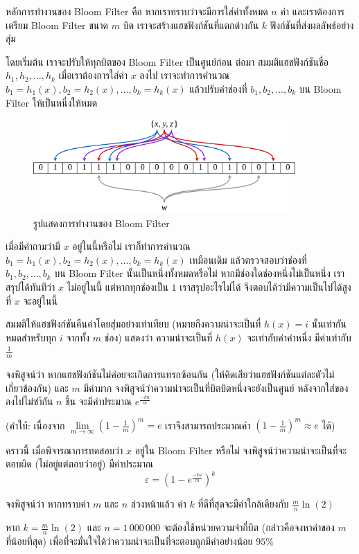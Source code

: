 หลักการทำงานของ Bloom Filter คือ หากเราทราบว่าจะมีการใส่ค่าทั้งหมด $n$ ค่า และเราต้องการเตรียม Bloom Filter ขนาด $m$ บิต เราจะสร้างแฮชฟังก์ชันที่แตกต่างกัน $k$ ฟังก์ชันที่ส่งผลลัพธ์อย่างสุ่ม

โดยเริ่มต้น เราจะปรับให้ทุกบิตของ Bloom Filter เป็นศูนย์ก่อน ต่อมา สมมติแฮชฟังก์ชันชื่อ $h_1, h_2, \dots, h_k$ เมื่อเราต้องการใส่ค่า $x$ ลงไป เราจะทำการคำนวณ $b_1 = h_1(x), b_2 = h_2(x), \dots, b_k = h_k(x)$ แล้วปรับค่าช่องที่ $b_1, b_2, \dots, b_k$ บน Bloom Filter ให้เป็นหนึ่งให้หมด

\begin{figure}[htbp]
    \centering
    \includegraphics[width=10cm]{chapters/bloomfilter.png}
    \caption{รูปแสดงการทำงานของ Bloom Filter}
    \label{fig:bloom_filter}
\end{figure}

เมื่อมีคำถามว่ามี $x$ อยู่ในนี้หรือไม่ เราก็ทำการคำนวณ $b_1 = h_1(x), b_2 = h_2(x), \dots, b_k = h_k(x)$ เหมือนเดิม แล้วตรวจสอบว่าช่องที่ $b_1, b_2, \dots, b_k$ บน Bloom Filter นั้นเป็นหนึ่งทั้งหมดหรือไม่ หากมีช่องใดช่องหนึ่งไม่เป็นหนึ่ง เราสรุปได้ทันทีว่า $x$ ไม่อยู่ในนี้ แต่หากทุกช่องเป็น $1$ เราสรุปอะไรไม่ได้ จึงตอบได้ว่ามีความเป็นไปได้สูงที่ $x$ จะอยู่ในนี้

สมมติให้แฮชฟังก์ชันคืนค่าโดยสุ่มอย่างเท่าเทียบ (หมายถึงความน่าจะเป็นที่ $h(x) = i$ นั้นเท่ากันหมดสำหรับทุก $i$ จากทั้ง $m$ ช่อง) แสดงว่า ความน่าจะเป็นที่ $h(x)$ จะเท่ากับค่าค่าหนึ่ง มีค่าเท่ากับ $\frac{1}{m}$ 

\begin{exercise}
จงพิสูจน์ว่า หากแฮชฟังก์ชันไม่ค่อยจะเกิดการแทรกซ้อนกัน (ให้คิดเสียว่าแฮชฟังก์ชันแต่ละตัวไม่เกี่ยวข้องกัน) และ $m$ มีค่ามาก จงพิสูจน์ว่าความน่าจะเป็นที่บิตบิตหนึ่งจะยังเป็นศูนย์ หลังจากใส่ของลงไปไม่ซำ้กัน $n$ ชิ้น จะมีค่าประมาณ $e^\frac{-kn}{m}$

(คำใบ้: เนื่องจาก $\lim\limits_{m \to \infty} \left(1-\frac{1}{m}\right)^m = e$ เราจึงสามารถประมาณค่า $\left(1-\frac{1}{m}\right)^m \approx e$ ได้)
\end{exercise}

\begin{exercise}
คราวนี้ เมื่อพิจารณาการทดสอบว่า $x$ อยู่ใน Bloom Filter หรือไม่ จงพิสูจน์ว่าความน่าจะเป็นที่จะตอบผิด (ไม่อยู่แต่ตอบว่าอยู่) มีค่าประมาณ
\[
\varepsilon = (1-e^\frac{-kn}{m})^k
\]
\end{exercise}

\begin{exercise}
จงพิสูจน์ว่า หากทราบค่า $m$ และ $n$ ล่วงหน้าแล้ว ค่า $k$ ที่ดีที่สุดจะมีค่าใกล้เคียงกับ $\frac{m}{n} \ln(2)$
\end{exercise}

\begin{exercise}
หาก $k = \frac{m}{n} \ln(2)$ และ $n = 1\,000\,000$ จะต้องใช้หน่วยความจำกี่บิต (กล่่าวคือจงหาค่าของ $m$ ที่น้อยที่สุด) เพื่อที่จะมั่นใจได้ว่าความน่าจะเป็นที่จะตอบถูกมีค่าอย่างน้อย $95\%$
\end{exercise}